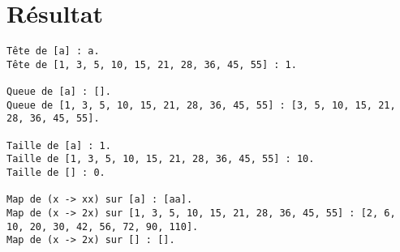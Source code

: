 \documentclass[12pt,french]{article}
\begin{document}
\section{Résultat}
\begin{verbatim}
Tête de [a] : a.
Tête de [1, 3, 5, 10, 15, 21, 28, 36, 45, 55] : 1.

Queue de [a] : [].
Queue de [1, 3, 5, 10, 15, 21, 28, 36, 45, 55] : [3, 5, 10, 15, 21, 28, 36, 45, 55].

Taille de [a] : 1.
Taille de [1, 3, 5, 10, 15, 21, 28, 36, 45, 55] : 10.
Taille de [] : 0.

Map de (x -> xx) sur [a] : [aa].
Map de (x -> 2x) sur [1, 3, 5, 10, 15, 21, 28, 36, 45, 55] : [2, 6, 10, 20, 30, 42, 56, 72, 90, 110].
Map de (x -> 2x) sur [] : [].
\end{verbatim}
\end{document}
